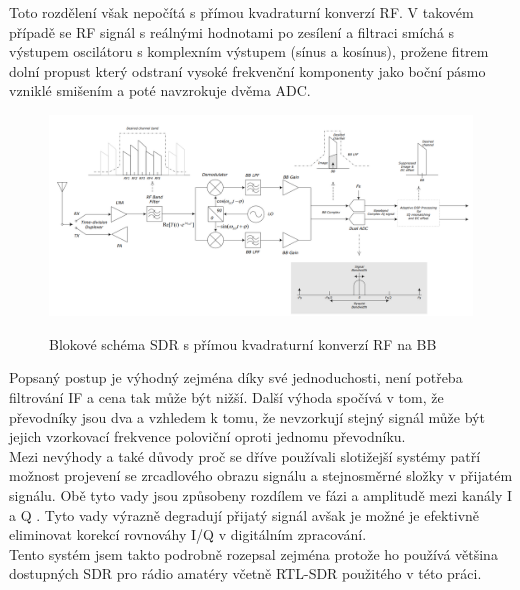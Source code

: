 \documentclass{ctuthesis}
\begin{document}
Toto rozdělení však nepočítá s přímou kvadraturní konverzí RF. V takovém případě se RF signál s reálnými hodnotami po zesílení a filtraci smíchá s výstupem oscilátoru s komplexním výstupem (sínus a kosínus), prožene fitrem dolní propust který odstraní vysoké frekvenční komponenty jako boční pásmo vzniklé smišením a poté navzrokuje dvěma ADC.\cite{andrasretzler2014}\\
\begin{figure}
\caption{Blokové schéma SDR s přímou kvadraturní konverzí RF na BB\cite{directdown2013}}
\includegraphics[width=1\textwidth]{./images/principSDR.png}
\label{principSDR}
\end{figure}
Popsaný postup je výhodný zejména díky své jednoduchosti, není potřeba filtrování IF a cena tak může být nižší. Další výhoda spočívá v tom, že převodníky jsou dva a vzhledem k tomu, že nevzorkují stejný signál může být jejich vzorkovací frekvence poloviční oproti jednomu převodníku.\\
Mezi nevýhody a také důvody proč se dříve používali slotižejší systémy patří možnost projevení se zrcadlového obrazu signálu a stejnosměrné složky v přijatém signálu. Obě tyto vady jsou způsobeny rozdílem ve fázi a amplitudě mezi kanály I a Q . Tyto vady výrazně degradují přijatý signál avšak je možné je efektivně eliminovat korekcí rovnováhy I/Q v digitálním zpracování.\\
Tento systém jsem takto podrobně rozepsal zejména protože ho používá většina dostupných SDR pro rádio amatéry včetně RTL-SDR použitého v této práci.
\end{document}
